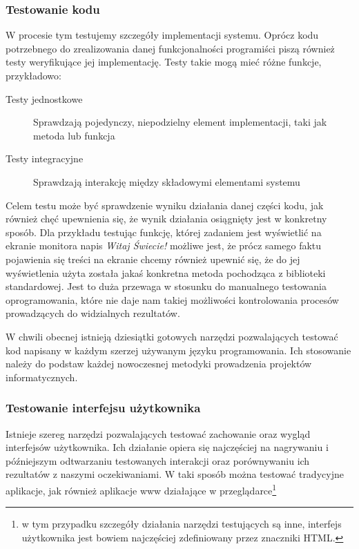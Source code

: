 	    \subsubsection{Testowanie kodu}
	    
	      W procesie tym testujemy szczegóły implementacji systemu. Oprócz kodu potrzebnego do zrealizowania danej funkcjonalności programiści piszą również testy weryfikujące jej implementację. Testy takie mogą mieć różne funkcje, przykładowo:
	      
	      \begin{description}
	        \item[Testy jednostkowe] Sprawdzają pojedynczy, niepodzielny element implementacji, taki jak metoda lub funkcja
	        \item[Testy integracyjne] Sprawdzają interakcję między składowymi elementami systemu
        \end{description}
        
        Celem testu może być sprawdzenie wyniku działania danej części kodu, jak również chęć upewnienia się, że wynik działania osiągnięty jest w konkretny sposób. Dla przykładu testując funkcję, której zadaniem jest wyświetlić na ekranie monitora napis \emph{Witaj Świecie!} możliwe jest, że prócz samego faktu pojawienia się treści na ekranie chcemy również upewnić się, że do jej wyświetlenia użyta została jakaś konkretna metoda pochodząca z biblioteki standardowej. Jest to duża przewaga w stosunku do manualnego testowania oprogramowania, które nie daje nam takiej możliwości kontrolowania procesów prowadzących do widzialnych rezultatów.

        W chwili obecnej istnieją dziesiątki gotowych narzędzi pozwalających testować kod napisany w każdym szerzej używanym języku programowania. Ich stosowanie należy do podstaw każdej nowoczesnej metodyki prowadzenia projektów informatycznych.
        
      \subsubsection{Testowanie interfejsu użytkownika}
        
        Istnieje szereg narzędzi pozwalających testować zachowanie oraz wygląd interfejsów użytkownika. Ich działanie opiera się najczęściej na nagrywaniu i późniejszym odtwarzaniu testowanych interakcji oraz porównywaniu ich rezultatów z naszymi oczekiwaniami. W taki sposób można testować tradycyjne aplikacje, jak również aplikacje www działające w przeglądarce\footnote{w tym  przypadku szczegóły działania narzędzi testujących są inne, interfejs użytkownika jest bowiem najczęściej zdefiniowany przez znaczniki HTML.}
        
